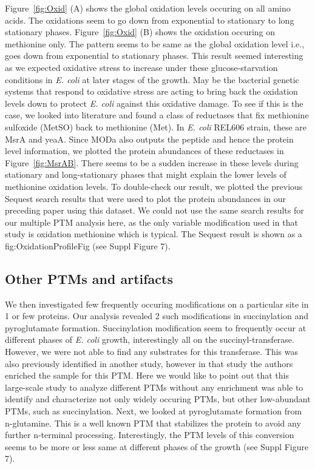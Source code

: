 \documentclass[12pt]{article}
\begin{document}
Figure~\ref{fig:Oxid} (A) shows the global oxidation levels occuring on all amino acids. The oxidations seem to go down from exponential to stationary to long stationary phases. Figure~\ref{fig:Oxid} (B) shows the oxidation occuring on methionine only. The pattern seems to be same as the global oxidation level i.e., goes down from exponential to stationary phases. This result seemed interesting as we expected oxidative stress to increase under these glucose-starvation conditions in \emph{E. coli} at later stages of the growth. May be the bacterial genetic systems that respond to oxidative stress are acting to bring back the oxidation levels down to protect \emph{E. coli} against this oxidative damage. To see if this is the case, we looked into literature and found a class of reductases that fix methionine sulfoxide (MetSO) back to methionine (Met).  In \emph{E. coli} REL606 strain, these are MsrA and yeaA. Since MODa also outputs the peptide and hence the protein level information, we plotted the protein abundances of these reductases in Figure~\ref{fig:MsrAB}. There seems to be a sudden increase in these levels during stationary and long-stationary phases that might explain the lower levels of methionine oxidation levels. To double-check our result, we plotted the previous Sequest search results that were used to plot the protein abundances in our preceding paper using this dataset. We  could not use the same search results for our multiple PTM analysis here, as the only variable modification used in that study is oxidation methionine which is typical. The Sequest result is shown as a fig:OxidationProfileFig (see Suppl Figure 7).

\subsection{Other PTMs and artifacts}

We then investigated few frequently occuring modifications on a particular site in 1 or few proteins. Our analysis revealed 2 such modifications in succinylation and pyroglutamate formation. Succinylation modification seem to frequently occur at different phases of \emph{E. coli} growth, interestingly all on the succinyl-transferase. However, we were not able to find any substrates for this transferase. This was also previously identified in another study, however in that study the authors enriched the sample for this PTM. Here we would like to point out that this large-scale study to analyze different PTMs without any enrichment was able to identify and characterize not only widely occuring PTMs, but other low-abundant PTMs, such as succinylation.  Next, we looked at pyroglutamate formation from n-glutamine. This is a well known PTM that stabilizes the protein to avoid any further n-terminal processing. Interestingly, the PTM levels of this conversion seems to be more or less same at different phases of the growth (see Suppl Figure 7).
\end{document}
